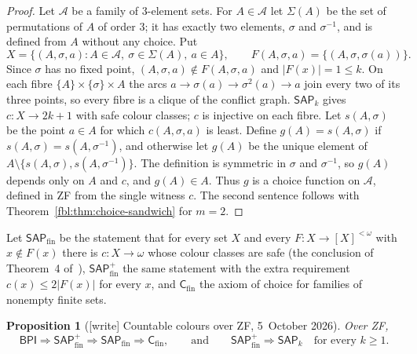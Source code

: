 \documentclass[11pt]{article}
\newtheorem{proposition}[theorem]{Proposition}
\theoremstyle{definition}
\theoremstyle{remark}
\newcommand{\cA}{\mathcal A}
\newcommand{\BPI}{\mathsf{BPI}}
\newcommand{\SAP}{\mathsf{SAP}}
\newcommand{\Cm}{\mathsf{C}}
\begin{document}
\begin{proof}
Let $\cA$ be a family of $3$-element sets. For $A\in\cA$ let $\Sigma(A)$ be
the set of permutations of $A$ of order $3$; it has exactly two elements,
$\sigma$ and $\sigma^{-1}$, and is defined from $A$ without any choice. Put
\[
 X=\{(A,\sigma,a):A\in\cA,\ \sigma\in\Sigma(A),\ a\in A\},\qquad
 F(A,\sigma,a)=\{(A,\sigma,\sigma(a))\}.
\]
Since $\sigma$ has no fixed point, $(A,\sigma,a)\notin F(A,\sigma,a)$ and
$\lvert F(x)\rvert=1\le k$. On each fibre $\{A\}\times\{\sigma\}\times A$
the arcs $a\to\sigma(a)\to\sigma^2(a)\to a$ join every two of its three
points, so every fibre is a clique of the conflict graph. $\SAP_k$ gives
$c:X\to2k+1$ with safe colour classes; $c$ is injective on each fibre. Let
$s(A,\sigma)$ be the point $a\in A$ for which $c(A,\sigma,a)$ is least.
Define $g(A)=s(A,\sigma)$ if $s(A,\sigma)=s(A,\sigma^{-1})$, and otherwise
let $g(A)$ be the unique element of $A\setminus\{s(A,\sigma),
s(A,\sigma^{-1})\}$. The definition is symmetric in $\sigma$ and
$\sigma^{-1}$, so $g(A)$ depends only on $A$ and $c$, and $g(A)\in A$. Thus
$g$ is a choice function on $\cA$, defined in ZF from the single
witness $c$. The second sentence follows with
Theorem~\ref{fbl:thm:choice-sandwich} for $m=2$.
\end{proof}

Let $\SAP_{\mathrm{fin}}$ be the statement that for every set $X$ and every
$F:X\to[X]^{<\omega}$ with $x\notin F(x)$ there is $c:X\to\omega$ whose
colour classes are safe (the conclusion of Theorem~4
of~\cite{deBruijnErdos}), $\SAP^{+}_{\mathrm{fin}}$ the same statement with
the extra requirement $c(x)\le2\lvert F(x)\rvert$ for every $x$, and
$\Cm_{\mathrm{fin}}$ the axiom of choice for families of nonempty finite
sets.

\begin{proposition}[{[write]} Countable colours over ZF, 5~October 2026]
\label{fbl:prop:finite}
Over ZF,
\[
 \BPI\Longrightarrow\SAP^{+}_{\mathrm{fin}}\Longrightarrow\SAP_{\mathrm{fin}}
 \Longrightarrow\Cm_{\mathrm{fin}},
 \qquad\text{and}\qquad
 \SAP^{+}_{\mathrm{fin}}\Longrightarrow\SAP_k\quad\text{for every }k\ge1.
\]
\end{proposition}
\end{document}
